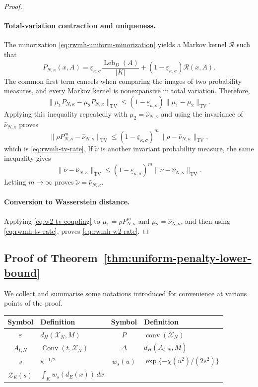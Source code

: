 \documentclass{article}
\newcommand{\TV}{\mathrm{TV}}
\newcommand{\Leb}{\operatorname{Leb}}
\newcommand{\whatnu}{\widehat\nu_{N,\kappa}}
\numberwithin{equation}{section}
\newcommand{\eps}{\varepsilon}
\renewcommand{\epsilon}{\eps}
\begin{document}
\begin{proof}
\paragraph{Total-variation contraction and uniqueness.}
The minorization \eqref{eq:rwmh-uniform-minorization} yields a Markov
kernel $\mathcal R$ such that
\[
 P_{N,\kappa}(x,A)
 =
 \underline\varepsilon_{\kappa,\sigma}
 \frac{\Leb_D(A)}{|K|}
 +(1-\underline\varepsilon_{\kappa,\sigma})\mathcal R(x,A).
\]
The common first term cancels when comparing the images of two
probability measures, and every Markov kernel is nonexpansive in total
variation. Therefore,
\[
 \lVert\mu_1P_{N,\kappa}-\mu_2P_{N,\kappa}\rVert_{\TV}
 \le
 (1-\underline\varepsilon_{\kappa,\sigma})
 \lVert\mu_1-\mu_2\rVert_{\TV}.
\]
Applying this inequality repeatedly with $\mu_2=\whatnu$ and using
the invariance of $\whatnu$ proves 
\[
 \lVert\rho P_{N,\kappa}^m-\whatnu\rVert_{\TV}
 \le
 (1-\underline\varepsilon_{\kappa,\sigma})^m
 \lVert\rho-\whatnu\rVert_{\TV},
\]
which is \eqref{eq:rwmh-tv-rate}. If $\widetilde\nu$ is another
invariant probability measure, the same inequality gives
\[
 \lVert\widetilde\nu-\whatnu\rVert_{\TV}
 \le
 (1-\underline\varepsilon_{\kappa,\sigma})^m
 \lVert\widetilde\nu-\whatnu\rVert_{\TV}.
\]
Letting $m\to\infty$ proves $\widetilde\nu=\whatnu$.

\paragraph{Conversion to Wasserstein distance.}
Applying \eqref{eq:w2-tv-coupling} to
$\mu_1=\rho P_{N,\kappa}^m$ and $\mu_2=\whatnu$, and then using
\eqref{eq:rwmh-tv-rate}, proves
\eqref{eq:rwmh-w2-rate}.
\end{proof}



\subsection{Proof of Theorem~\ref{thm:uniform-penalty-lower-bound}}\label{sec:prf-lowerbound}

We collect and summarise some notations introduced for convenience at various points of the proof.
\begin{center}
\begin{tabular}{|@{}cl|cl@{}|}
\toprule
Symbol & Definition & Symbol & Definition \\
\midrule
$\epsilon$ & $d_H(\mathcal X_N,M)$
& $P$ & $\operatorname{conv}(\mathcal X_N)$ \\
$A_{t,N}$ & $\operatorname{Conv}(t,\mathcal X_N)$
& $\Delta$ & $d_H(A_{t,N},M)$ \\
$s$ & $\kappa^{-1/2}$
& $w_s(u)$ & $\exp\{-\chi(u^2)/(2s^2)\}$ \\
$\mathcal Z_E(s)$ & $\displaystyle\int_K w_s(d_E(x))\,dx$
&  &  \\
\bottomrule
\end{tabular}
\end{center}
\end{document}

